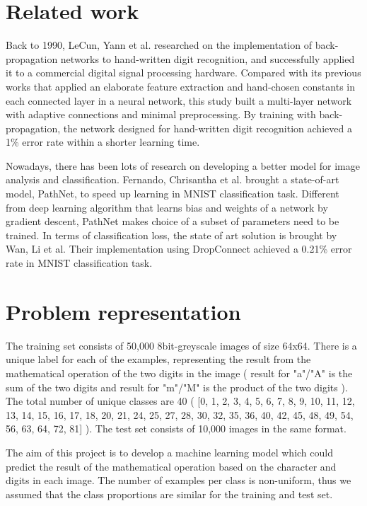 \documentclass[10pt,conference]{IEEEtran}
\begin{document}
\section{Related work}

Back to 1990, LeCun, Yann et al.\cite{lecun1990handwritten} researched on the implementation of back-propagation networks to hand-written digit recognition, and successfully applied it to a commercial digital signal processing hardware. Compared with its previous works that applied an elaborate feature extraction and hand-chosen constants in each connected layer in a neural network, this study built a multi-layer network with adaptive connections and minimal preprocessing. By training with back-propagation, the network designed for hand-written digit recognition achieved a 1\% error rate within a shorter learning time. 

Nowadays, there has been lots of research on developing a better model for image analysis and classification. Fernando, Chrisantha et al.\cite{fernando2017pathnet} brought a state-of-art model, PathNet, to speed up learning in MNIST classification task. Different from deep learning algorithm that learns bias and weights of a network by gradient descent, PathNet makes choice of a subset of parameters need to be trained. In terms of classification loss, the state of art solution is brought by Wan, Li et al. Their implementation using DropConnect achieved a 0.21\% error rate in MNIST classification task\cite{wan2013regularization}.

\section{Problem representation}
The training set consists of 50,000 8bit-greyscale images of size 64x64. There is a unique label for each of the examples, representing the result from the mathematical operation of the two digits in the image ( result for "a"/"A" is the sum of the two digits and result for "m"/"M" is the product of the two digits ). The total number of unique classes are 40 ( [0, 1, 2, 3, 4, 5, 6, 7, 8, 9, 10, 11, 12, 13, 14, 15, 16, 17, 18, 20, 21, 24, 25, 27, 28, 30, 32, 35, 36, 40, 42, 45, 48, 49, 54, 56, 63, 64, 72, 81] ). The test set consists of 10,000 images in the same format.

The aim of this project is to develop a machine learning model which could predict the result of the mathematical operation based on the character and digits in each image. The number of examples per class is non-uniform, thus we assumed that the class proportions are similar for the training and test set. 
\end{document}
